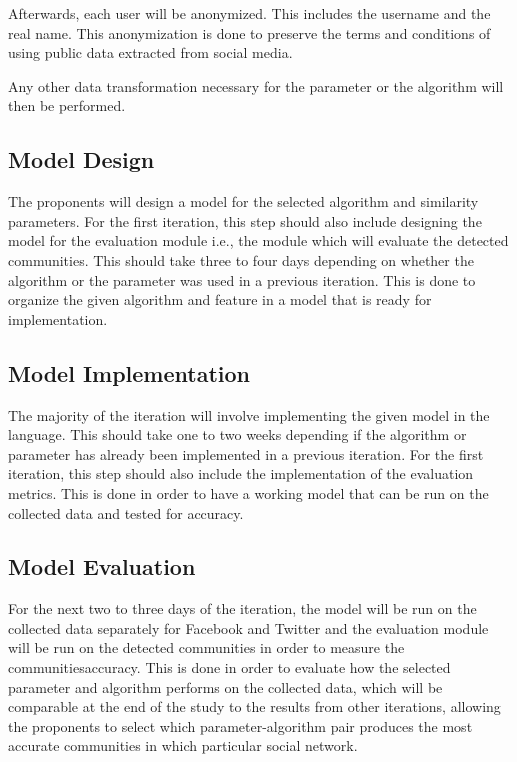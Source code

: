 Afterwards, each user will be anonymized. This includes the username and the real name.  This anonymization is done to preserve the terms and conditions of using public data extracted from social media. 

Any other data transformation necessary for the parameter or the algorithm will then be performed.

\subsection{Model Design}

The proponents will design a model for the selected algorithm and similarity parameters. For the first iteration, this step should also include designing the model for the evaluation module i.e., the module which will evaluate the detected communities. This should take three to four days depending on whether the algorithm or the parameter was used in a previous iteration. This is done to organize the given algorithm and feature in a model that is ready for implementation.

\subsection{Model Implementation}

The majority of the iteration will involve implementing the given model in the language. This should take one to two weeks depending if the algorithm or parameter has already been implemented in a previous iteration. For the first iteration, this step should also include the implementation of the evaluation metrics. This is done in order to have a working model that can be run on the collected data and tested for accuracy.

\subsection{Model Evaluation}

For the next two to three days of the iteration, the model will be run on the collected data separately for Facebook and Twitter and the evaluation module will be run on the detected communities in order to measure the communities\vtick accuracy. This is done in order to evaluate how the selected parameter and algorithm performs on the collected data, which will be comparable at the end of the study to the results from other iterations, allowing the proponents to select which parameter-algorithm pair produces the most accurate communities in which particular social network.

